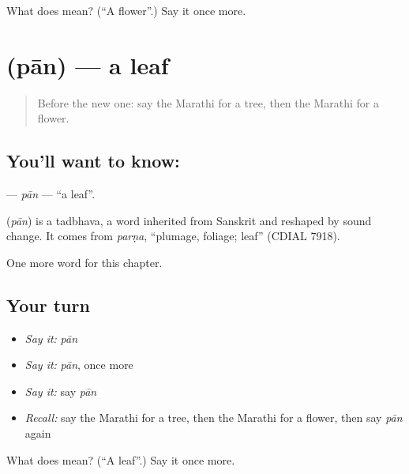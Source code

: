 \begin{tcolorbox}[breakable,colback=teal!4,colframe=teal!35!black,title={Before you move on}]
What does  mean? (\textquotedblleft{}A flower\textquotedblright{}.) Say it once more.
\end{tcolorbox}
\section[\texorpdfstring{\mr{पान} (pān)}{पान (pān)}]{ (pān) — a leaf}

\label{lesson:MR-C96-pan}



\begin{quote}
Before the new one: say the Marathi for a tree, then the Marathi for a flower.
\end{quote}

\subsection*{You'll want to know: }
\textbf{} — \emph{pān} — \textquotedblleft{}a leaf\textquotedblright{}.

\begin{cousinweb}
\textbf{} (\emph{pān}) is a tadbhava, a word inherited from Sanskrit and reshaped by sound change. It comes from \emph{parṇa}, \textquotedblleft{}plumage, foliage; leaf\textquotedblright{} (CDIAL 7918).
\end{cousinweb}

\begin{grammarlens}[title={What you've built}]
One more word for this chapter.
\end{grammarlens}

\subsection*{Your turn}
\begin{itemize}
\raggedright
  \item \emph{Say it:} \emph{pān}
  \item \emph{Say it:} \emph{pān}, once more
  \item \emph{Say it:} say \emph{pān}
  \item \emph{Recall:} say the Marathi for a tree, then the Marathi for a flower, then say \emph{pān} again
\end{itemize}

\begin{tcolorbox}[breakable,colback=teal!4,colframe=teal!35!black,title={Before you move on}]
What does  mean? (\textquotedblleft{}A leaf\textquotedblright{}.) Say it once more.
\end{tcolorbox}
